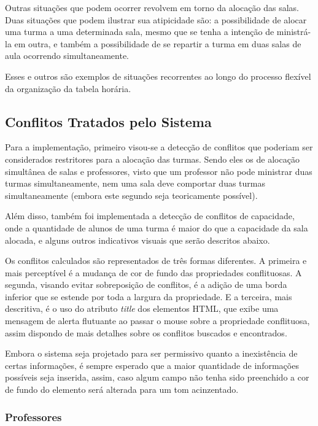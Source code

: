 Outras situações que podem ocorrer revolvem em torno da alocação das salas. Duas situações que podem ilustrar sua atipicidade são: a possibilidade de alocar uma turma a uma determinada sala, mesmo que se tenha a intenção de ministrá-la em outra, e também a possibilidade de se repartir a turma em duas salas de aula ocorrendo simultaneamente.

Esses e outros são exemplos de situações recorrentes ao longo do processo flexível da organização da tabela horária.

\subsection{Conflitos Tratados pelo Sistema}

Para a implementação, primeiro visou-se a detecção de conflitos que poderiam ser considerados restritores para a alocação das turmas. Sendo eles os de alocação simultânea de salas e professores, visto que um professor não pode ministrar duas turmas simultaneamente, nem uma sala deve comportar duas turmas simultaneamente (embora este segundo seja teoricamente possível).

Além disso, também foi implementada a detecção de conflitos de capacidade, onde a quantidade de alunos de uma turma é maior do que a capacidade da sala alocada, e alguns outros indicativos visuais que serão descritos abaixo.

Os conflitos calculados são representados de três formas diferentes. A primeira e mais perceptível é a mudança de cor de fundo das propriedades conflituosas. A segunda, visando evitar sobreposição de conflitos, é a adição de uma borda inferior que se estende por toda a largura da propriedade. E a terceira, mais descritiva, é o uso do atributo \textit{title} dos elementos HTML, que exibe uma mensagem de alerta flutuante ao passar o mouse sobre a propriedade conflituosa, assim dispondo de mais detalhes sobre os conflitos buscados e encontrados.

Embora o sistema seja projetado para ser permissivo quanto a inexistência de certas informações, é sempre esperado que a maior quantidade de informações possíveis seja inserida, assim, caso algum campo não tenha sido preenchido a cor de fundo do elemento será alterada para um tom acinzentado.


\subsubsection{Professores}

